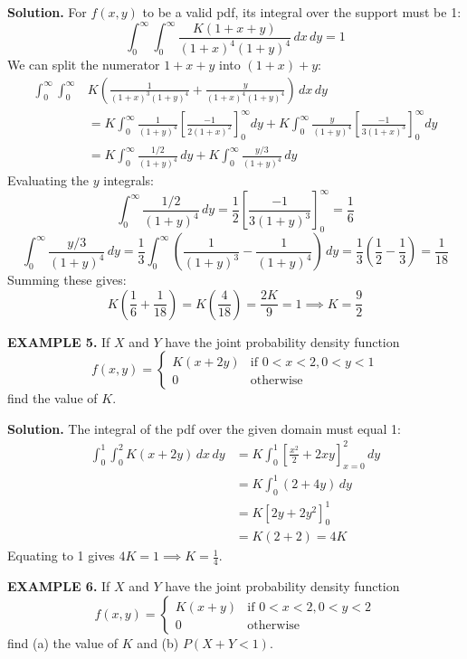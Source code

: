 \documentclass{article}
\begin{document}
\textbf{Solution.} For $f(x,y)$ to be a valid pdf, its integral over the support must be 1:
$$\int_{0}^{\infty} \int_{0}^{\infty} \frac{K(1+x+y)}{(1+x)^4 (1+y)^4} \,dx \,dy = 1$$
We can split the numerator $1+x+y$ into $(1+x) + y$:
\begin{align*}
\int_{0}^{\infty} \int_{0}^{\infty} & K \left( \frac{1}{(1+x)^3(1+y)^4} + \frac{y}{(1+x)^4(1+y)^4} \right) \,dx \,dy \\
&= K \int_{0}^{\infty} \frac{1}{(1+y)^4} \left[ \frac{-1}{2(1+x)^2} \right]_{0}^{\infty} dy + K \int_{0}^{\infty} \frac{y}{(1+y)^4} \left[ \frac{-1}{3(1+x)^3} \right]_{0}^{\infty} dy \\
&= K \int_{0}^{\infty} \frac{1/2}{(1+y)^4} \,dy + K \int_{0}^{\infty} \frac{y/3}{(1+y)^4} \,dy
\end{align*}
Evaluating the $y$ integrals:
$$\int_{0}^{\infty} \frac{1/2}{(1+y)^4} \,dy = \frac{1}{2} \left[ \frac{-1}{3(1+y)^3} \right]_{0}^{\infty} = \frac{1}{6}$$
$$\int_{0}^{\infty} \frac{y/3}{(1+y)^4} \,dy = \frac{1}{3} \int_{0}^{\infty} \left( \frac{1}{(1+y)^3} - \frac{1}{(1+y)^4} \right) \,dy = \frac{1}{3} \left( \frac{1}{2} - \frac{1}{3} \right) = \frac{1}{18}$$
Summing these gives:
$$K \left( \frac{1}{6} + \frac{1}{18} \right) = K \left( \frac{4}{18} \right) = \frac{2K}{9} = 1 \implies K = \frac{9}{2}$$

\vspace{1em}

\textbf{EXAMPLE 5.} If $X$ and $Y$ have the joint probability density function
$$
f(x, y) = \begin{cases} K(x+2y) & \text{if } 0 < x < 2, 0 < y < 1 \\ 0 & \text{otherwise} \end{cases}
$$
find the value of $K$.

\textbf{Solution.} The integral of the pdf over the given domain must equal 1:
\begin{align*}
\int_{0}^{1} \int_{0}^{2} K(x+2y) \,dx \,dy &= K \int_{0}^{1} \left[ \frac{x^2}{2} + 2xy \right]_{x=0}^{2} \,dy \\
&= K \int_{0}^{1} (2 + 4y) \,dy \\
&= K \left[ 2y + 2y^2 \right]_{0}^{1} \\
&= K(2 + 2) = 4K
\end{align*}
Equating to 1 gives $4K = 1 \implies K = \frac{1}{4}$.

\vspace{1em}

\textbf{EXAMPLE 6.} If $X$ and $Y$ have the joint probability density function
$$
f(x, y) = \begin{cases} K(x+y) & \text{if } 0 < x < 2, 0 < y < 2 \\ 0 & \text{otherwise} \end{cases}
$$
find (a) the value of $K$ and (b) $P(X +Y < 1)$.
\end{document}

